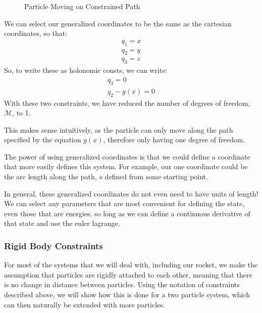 \documentclass[12pt]{report}
\begin{document}
\begin{figure}[ht]

    \caption{Particle Moving on Constrained Path}
    \label{fig:constrainted path}
\end{figure}
We can select our generalized coordinates to be the same as the cartesian coordinates, so that:
\begin{gather}
    q_1=x\\q_2=y\\q_3=z
\end{gather}
So, to write these as \glspl{holonomic const}, we can write:
\begin{gather}
    q_3=0\\
    q_2-g(x)=0
\end{gather}
With these two constraints, we have reduced the number of degrees of freedom, $\mathcal{M}$, to 1.

This makes sense intuitively, as the particle can only move along the path specified by the equation $g(x)$, therefore only having one degree of freedom.

The power of using generalized coordinates is that we could define a coordinate that more easily defines this system. For example, our one coordinate could be the arc length along the path, $s$ defined from some starting point.

In general, these generalized coordinates do not even need to have units of length! We can select any parameters that are most convenient for defining the state, even those that are energies, so long as we can define a continuous derivative of that state and use the \gls{euler lagrange}.

\subsubsection{Rigid Body Constraints}\label{sec: rigid body constraints}
For most of the systems that we will deal with, including our rocket, we make the assumption that particles are rigidly attached to each other, meaning that there is no change in distance between particles. Using the notation of constraints described above, we will show how this is done for a two particle system, which can then naturally be extended with more particles.
\end{document}
